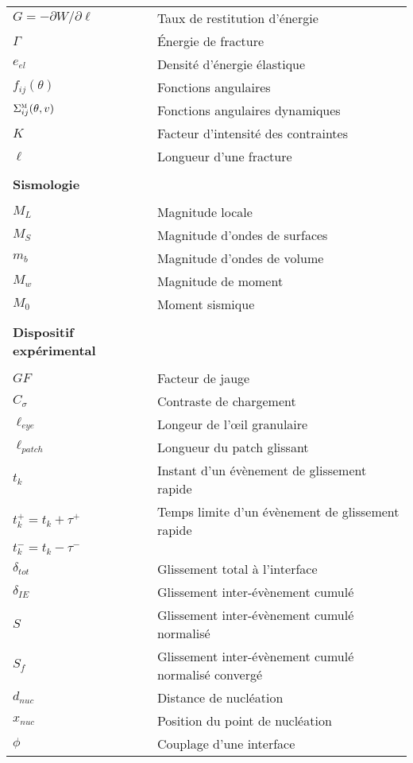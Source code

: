 \begin{tabularx}{\textwidth}{lX}
$G=-\partial W/\partial\ell$ & Taux de restitution d'énergie\\
$\Gamma$ & Énergie de fracture\\
$e_{el}$ & Densité d'énergie élastique\\
$f_{ij}(\theta)$ & Fonctions angulaires\\
$\Sigma_{ij}^\textsc{m}(\theta,v)$ & Fonctions angulaires dynamiques\\
$K$ & Facteur d'intensité des contraintes\\
$\ell$ & Longueur d'une fracture\\
%
%
\\
\textbf{Sismologie }\\
\\
$M_L$ & Magnitude locale\\
$M_S$ & Magnitude d'ondes de surfaces\\
$m_b$ & Magnitude d'ondes de volume\\
$M_w$ & Magnitude de moment\\
$M_0$ & Moment sismique\\
%
%
\\
\textbf{Dispositif expérimental }\\
\\
$GF$ & Facteur de jauge\\
$C_\sigma$ & Contraste de chargement\\
$\ell_{eye}$ & Longeur de l'œil granulaire\\
$\ell_{patch}$ & Longueur du patch glissant\\
$t_k$ & Instant d'un évènement de glissement rapide\\
$t_k^+ = t_k+\tau^+$ & Temps limite d'un évènement de glissement rapide\\
$t_k^- = t_k-\tau^-$ & \\
$\delta_{tot}$ & Glissement total à l'interface\\
$\delta_{IE}$ & Glissement inter-évènement cumulé\\
$S$ & Glissement inter-évènement cumulé normalisé\\
$S_f$ & Glissement inter-évènement cumulé normalisé convergé\\
$d_{nuc}$ & Distance de nucléation\\
$x_{nuc}$ & Position du point de nucléation\\
$\phi$ & Couplage d'une interface\\
\end{tabularx}





